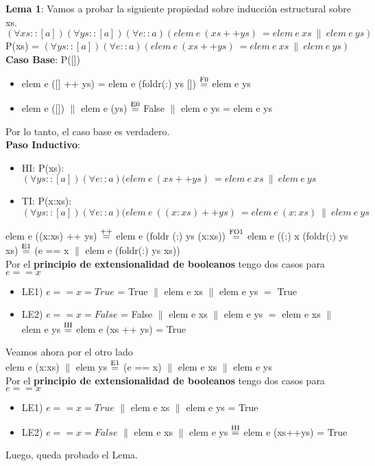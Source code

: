 \documentclass{article}
\begin{document}
\newpage
\textbf{Lema 1}: Vamos a probar la siguiente propiedad sobre inducción estructural sobre xs. \\
$(\forall xs :: [a])(\forall ys :: [a])(\forall e::a)(elem \ e \ (xs++ys) \ = elem \ e \ xs \ \| \ elem \ e \ ys)$ \\
P(xs) = $(\forall ys :: [a])(\forall e::a)(elem \ e \ (xs++ys) \ = elem \ e \ xs \ \| \ elem \ e \ ys)$ \\
\textbf{Caso Base}: P([])
\begin{itemize}
    \item elem e ([] ++ ys) = elem e (foldr(:) ys []) $\stackrel{\text{F0}}{=}$ elem e ys
    \item elem e ([]) $\|$ elem e (ys) $\stackrel{\text{E0}}{=}$ False $\|$ elem e ys = elem e ys
\end{itemize}
Por lo tanto, el caso base es verdadero. \\
\textbf{Paso Inductivo}: 
\begin{itemize}
    \item HI: P(xs): $(\forall ys :: [a])(\forall e::a)(elem \ e \ (xs++ys) \ = elem \ e \ xs \ \| \ elem \ e \ ys$
    \item TI: P(x:xs): $(\forall ys :: [a])(\forall e::a)(elem \ e \ ((x:xs)++ys) \ = elem \ e \ (x:xs) \ \| \ elem \ e \ ys$
\end{itemize}
elem e ((x:xs) ++ ys) $\stackrel{\text{++}}{=}$ elem e (foldr (:) ys (x:xs)) $\stackrel{\text{FO1}}{=}$ elem e ((:) x (foldr(:) ys xs) $\stackrel{\text{E1}}{=}$ (e == x $\|$ elem e (foldr(:) ys xs)) \\
Por el \textbf{principio de extensionalidad de booleanos} tengo dos casos para $e==x$
\begin{itemize}
    \item LE1) $e==x = True$ = True $\|$ elem e xs $\|$ elem e ys $=$ True
    \item LE2) $e==x = False$ = False $\|$ elem e xs $\|$ elem e ys $=$ elem e xs $\|$ elem e ys $\stackrel{\text{HI}}{=}$ elem e (xs ++ ys) = True 
\end{itemize}
Veamos ahora por el otro lado \\
elem e (x:xs) $\|$ elem ys $\stackrel{\text{E1}}{=}$ (e == x) $\|$ elem e xs $\|$ elem e ys \\
Por el \textbf{principio de extensionalidad de booleanos} tengo dos casos para $e==x$
\begin{itemize}
    \item LE1) $e==x = True$ $\|$ elem e xs $\|$ elem e ys = True 
    \item LE2) $e==x = False$ $\|$ elem e xs $\|$ elem e ys $\stackrel{\text{HI}}{=}$ elem e (xs++ys) = True 
\end{itemize}
Luego, queda probado el Lema. 
\end{document}
